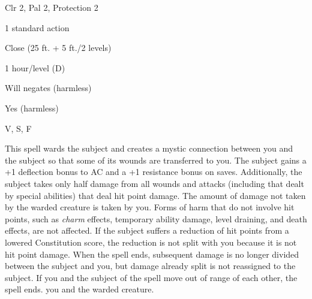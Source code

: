 
\begin{description*}
\item[Level:] Clr 2, Pal 2, Protection 2
\item[Casting Time:] 1 standard action
\item[Range:] Close (25 ft. + 5 ft./2 levels)
\item[Duration:] 1 hour/level (D)
\item[Saving Throw:] Will negates (harmless)
\item[Spell Resistance:] Yes (harmless)
\item[Components:] V, S, F
\end{description*}

This spell wards the subject and creates a mystic connection between you and the
subject so that some of its wounds are transferred to you. The subject gains a
+1 deflection bonus to AC and a +1 resistance bonus on saves. Additionally, the
subject takes only half damage from all wounds and attacks (including that dealt
by special abilities) that deal hit point damage. The amount of damage not taken
by the warded creature is taken by you. Forms of harm that do not involve hit points,
such as \textit{charm} effects, temporary ability damage, level draining, and death
effects, are not affected. If the subject suffers a reduction of hit points from
a lowered Constitution score, the reduction is not split with you because it is
not hit point damage. When the spell ends, subsequent damage is no longer divided
between the subject and you, but damage already split is not reassigned to the
subject.
If you and the subject of the spell move out of range of each other, the spell
ends.
you and the warded creature.